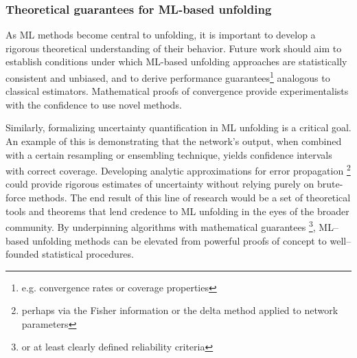              \subsubsection{Theoretical guarantees for ML-based unfolding}
                As ML methods become central to unfolding, it is important to develop a rigorous theoretical understanding of their behavior.
                Future work should aim to establish conditions under which ML-based unfolding approaches are statistically consistent and unbiased, and to derive performance guarantees\footnote{e.g. convergence rates or coverage properties} analogous to classical estimators.
                Mathematical proofs of convergence provide experimentalists with the confidence to use novel methods.
                
                Similarly, formalizing uncertainty quantification in ML unfolding is a critical goal.
                An example of this is demonstrating that the network's output, when combined with a certain resampling or ensembling technique, yields confidence intervals with correct coverage.
                Developing analytic approximations for error propagation \footnote{perhaps via the Fisher information or the delta method applied to network parameters} could provide rigorous estimates of uncertainty without relying purely on brute-force methods.
                The end result of this line of research would be a set of theoretical tools and theorems that lend credence to ML unfolding in the eyes of the broader community.
                By underpinning algorithms with mathematical guarantees \footnote{or at least clearly defined reliability criteria}, ML--based unfolding methods can be elevated from powerful proofs of concept to well--founded statistical procedures.


